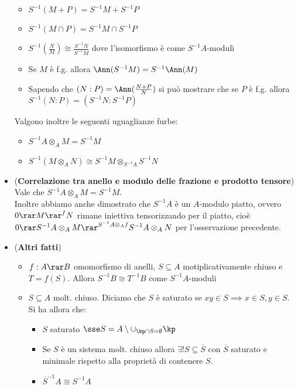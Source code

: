 \documentclass[a4paper,NoNotes,GeneralMath]{stdmdoc}
\begin{document}
\begin{itemize}
			\begin{itemize}
				\item $S^{-1}(M + P) = S^{-1}M + S^{-1}P$
				\item $S^{-1}(M \cap P) = S^{-1}M \cap S^{-1}P$
				\item $S^{-1}(\frac{N}{M}) \cong \frac{S^{-1}N}{S^{-1}M}$ dove l'isomorfismo è come $S^{-1}A$-moduli
				\item Se $M$ è f.g. allora $\Ann(S^{-1}M) = S^{-1}\Ann(M)$
				\item Sapendo che $(N:P) = \Ann(\frac{N+P}{N})$ si può mostrare che se $P$ è f.g. allora $S^{-1}(N:P) = (S^{-1}N : S^{-1}P)$
			\end{itemize}
		Valgono inoltre le seguenti uguaglianze furbe:
			\begin{itemize}
				\item $S^{-1}A \otimes_A M = S^{-1}M$
				\item $S^{-1}(M \otimes_A N) \cong S^{-1}M \otimes_{S^{-1}A} S^{-1}N$
			\end{itemize}
		\item ({\bf Correlazione tra anello e modulo delle frazione e prodotto tensore}) Vale che $S^{-1}A \otimes_A M = S^{-1}M$. \\
			Inoltre abbiamo anche dimostrato che $S^{-1}A$ è un $A$-modulo piatto, ovvero $0 \rar M \rar^f N$ rimane iniettiva tensorizzando per il piatto, cioè $0 \rar S^{-1}A \otimes_A M \rar^{S^{-1}A \otimes_A f} S^{-1}A \otimes_A N$ per l'osservazione precedente.
		\item ({\bf Altri fatti})
			\begin{itemize}
				\item $f: A \rar B$ omomorfismo di anelli, $S \subseteq A$ motiplicativamente chiuso e $T = f(S)$. Allora $S^{-1}B \cong T^{-1}B$ come $S^{-1}A$-moduli
				\item $S \subseteq A$ molt. chiuso. Diciamo che $S$ è saturato se $xy \in S \implies x \in S, y \in S$. Si ha allora che:
					\begin{itemize}
						\item $S$ saturato $\sse S = A \setminus \cup_{\kp \cap S = \emptyset} \kp$
						\item Se $S$ è un sistema molt. chiuso allora $\exists ! S \subseteq \overline{S}$ con $\overline{S}$ saturato e minimale rispetto alla proprietà di contenere $S$.
						\item $\overline{S}^{-1}A \cong S^{-1}A$
					\end{itemize}
			\end{itemize}
	\end{itemize}
	
\end{document}
